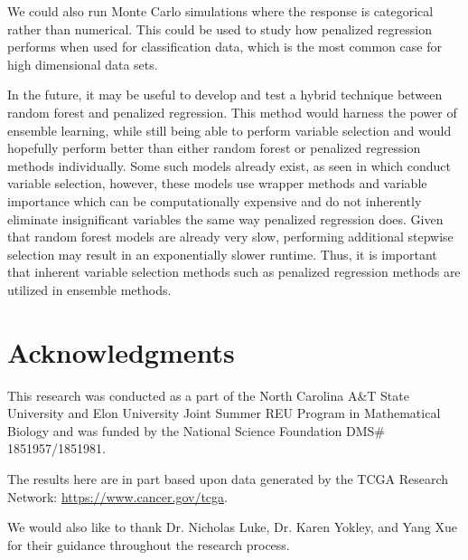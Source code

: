 \documentclass[final,onefignum,onetabnum]{siuro210301}
\begin{document}
	We could also run Monte Carlo simulations where the response is categorical rather than numerical. This could be used to study how penalized regression performs when used for classification data, which is the most common case for high dimensional data sets.
	
	In the future, it may be useful to develop and test a hybrid technique between random forest and penalized regression. This method would harness the power of ensemble learning, while still being able to perform variable selection and would hopefully perform better than either random forest or penalized regression methods individually. Some such models already exist, as seen in \cite{capitaine2021random, degenhardt2019evaluation, zhang2016variable} which conduct variable selection, however, these models use wrapper methods and variable importance which can be computationally expensive and do not inherently eliminate insignificant variables the same way penalized regression does. Given that random forest models are already very slow, performing additional stepwise selection may result in an exponentially slower runtime. Thus, it is important that inherent variable selection methods such as penalized regression methods are utilized in ensemble methods.
	
	\section{Acknowledgments}
	
	This research was conducted as a part of the North Carolina A\&T State University and Elon University Joint Summer REU Program in Mathematical Biology and was funded by the National Science Foundation DMS\# 1851957/1851981.
	
	The results here are in part based upon data generated by the TCGA Research Network: \href{https://www.cancer.gov/tcga}{https://www.cancer.gov/tcga}.
	
	We would also like to thank Dr. Nicholas Luke, Dr. Karen Yokley, and Yang Xue for their guidance throughout the research process.
	
\end{document}
